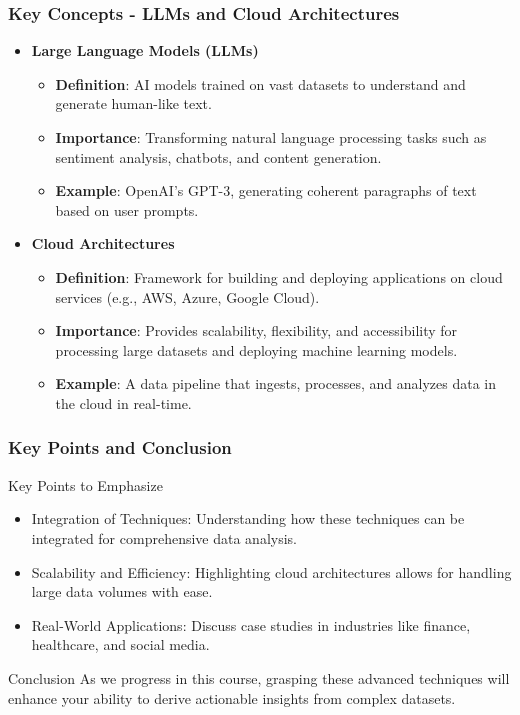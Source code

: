 \documentclass[aspectratio=169]{beamer}
\begin{document}
\begin{frame}[fragile]
    \frametitle{Key Concepts - LLMs and Cloud Architectures}
    \begin{itemize}
        \item \textbf{Large Language Models (LLMs)}
        \begin{itemize}
            \item \textbf{Definition}: AI models trained on vast datasets to understand and generate human-like text.
            \item \textbf{Importance}: Transforming natural language processing tasks such as sentiment analysis, chatbots, and content generation.
            \item \textbf{Example}: OpenAI's GPT-3, generating coherent paragraphs of text based on user prompts.
        \end{itemize}
        
        \item \textbf{Cloud Architectures}
        \begin{itemize}
            \item \textbf{Definition}: Framework for building and deploying applications on cloud services (e.g., AWS, Azure, Google Cloud).
            \item \textbf{Importance}: Provides scalability, flexibility, and accessibility for processing large datasets and deploying machine learning models.
            \item \textbf{Example}: A data pipeline that ingests, processes, and analyzes data in the cloud in real-time.
        \end{itemize}
    \end{itemize}
\end{frame}

\begin{frame}[fragile]
    \frametitle{Key Points and Conclusion}
    \begin{block}{Key Points to Emphasize}
        \begin{itemize}
            \item Integration of Techniques: Understanding how these techniques can be integrated for comprehensive data analysis.
            \item Scalability and Efficiency: Highlighting cloud architectures allows for handling large data volumes with ease.
            \item Real-World Applications: Discuss case studies in industries like finance, healthcare, and social media.
        \end{itemize}
    \end{block}
    \begin{block}{Conclusion}
        As we progress in this course, grasping these advanced techniques will enhance your ability to derive actionable insights from complex datasets.
    \end{block}
\end{frame}
\end{document}
